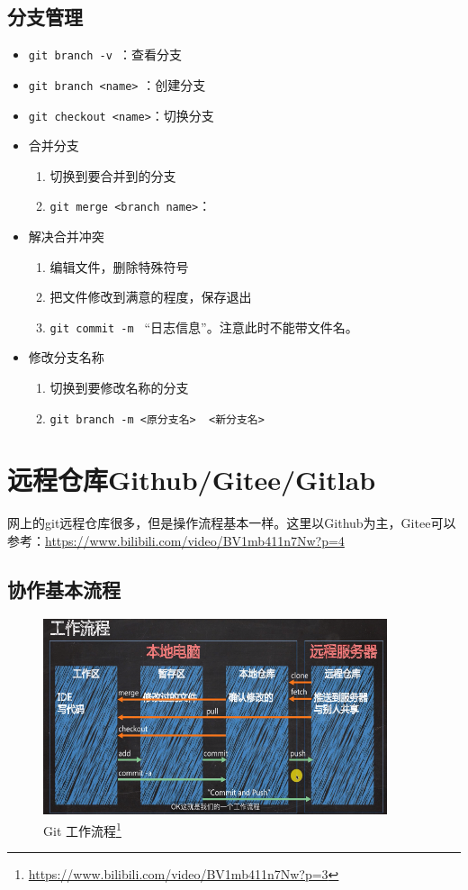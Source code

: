 \subsection{分支管理}
\begin{itemize}
\item \verb|git branch -v |：查看分支
\item \verb|git branch <name>| ：创建分支
\item \verb|git checkout <name>|：切换分支
\item 合并分支
\begin{enumerate}
\item 切换到要合并到的分支
\item \verb|git merge <branch name>|：
\end{enumerate}
\item 解决合并冲突
\begin{enumerate}
\item  编辑文件，删除特殊符号
\item 把文件修改到满意的程度，保存退出
\item \verb|git commit -m | ``日志信息''。注意此时不能带文件名。
\end{enumerate}

\item 修改分支名称
\begin{enumerate}
\item 切换到要修改名称的分支
\item \verb|git branch -m <原分支名>  <新分支名>|
\end{enumerate}
\end{itemize}



\section{远程仓库Github/Gitee/Gitlab}
网上的git远程仓库很多，但是操作流程基本一样。这里以Github为主，Gitee可以参考：\url{https://www.bilibili.com/video/BV1mb411n7Nw?p=4}


\subsection{协作基本流程}
\begin{figure}[h!]
\centering
\includegraphics[width=0.9\textwidth]{pictures/git.png}
\caption{Git 工作流程\footnote{\url{https://www.bilibili.com/video/BV1mb411n7Nw?p=3}}}
\end{figure}


